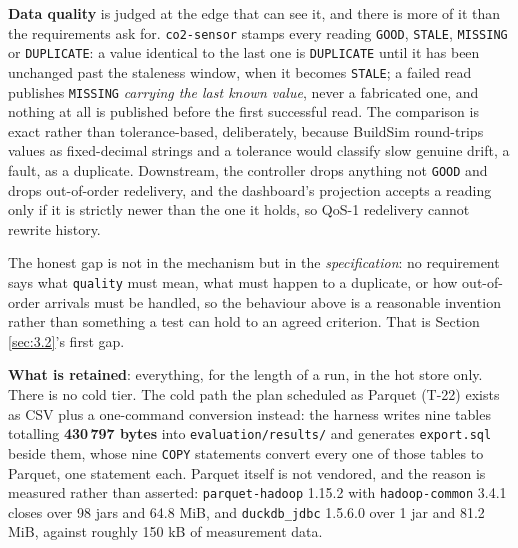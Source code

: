 \textbf{Data quality} is judged at the edge that can see it, and there is more of it than the
requirements ask for. \texttt{co2-sensor} stamps every reading \texttt{GOOD}, \texttt{STALE},
\texttt{MISSING} or \texttt{DUPLICATE}: a value identical to the last one is \texttt{DUPLICATE}
until it has been unchanged past the staleness window, when it becomes \texttt{STALE}; a failed read
publishes \texttt{MISSING} \emph{carrying the last known value}, never a fabricated one, and nothing
at all is published before the first successful read. The comparison is exact rather than
tolerance-based, deliberately, because BuildSim round-trips values as fixed-decimal strings and a
tolerance would classify slow genuine drift, a fault, as a duplicate. Downstream, the controller
drops anything not \texttt{GOOD} and drops out-of-order redelivery, and the dashboard's projection
accepts a reading only if it is strictly newer than the one it holds, so QoS-1 redelivery cannot
rewrite history.

The honest gap is not in the mechanism but in the \emph{specification}: no requirement says what
\texttt{quality} must mean, what must happen to a duplicate, or how out-of-order arrivals must be
handled, so the behaviour above is a reasonable invention rather than something a test can hold to
an agreed criterion. That is Section \ref{sec:3.2}'s first gap.

\textbf{What is retained}: everything, for the length of a run, in the hot store only. There is no
cold tier. The cold path the plan scheduled as Parquet (T-22) exists as CSV plus a one-command
conversion instead: the harness writes nine tables totalling \textbf{430\,797 bytes} into
\texttt{evaluation/results/} and generates \texttt{export.sql} beside them, whose nine \texttt{COPY}
statements convert every one of those tables to Parquet, one statement each. Parquet itself is not vendored, and the reason is
measured rather than asserted: \texttt{parquet-hadoop} 1.15.2 with \texttt{hadoop-common} 3.4.1
closes over 98 jars and 64.8 MiB, and \texttt{duckdb\_jdbc} 1.5.6.0 over 1 jar and 81.2 MiB, against
roughly 150 kB of measurement data.
